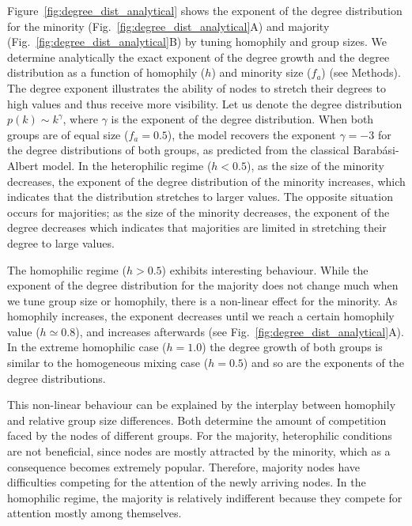 \noindent Figure~\ref{fig:degree_dist_analytical} shows the exponent of the degree distribution for the minority (Fig.~\ref{fig:degree_dist_analytical}A) and majority (Fig.~\ref{fig:degree_dist_analytical}B) by tuning homophily and group sizes. We determine analytically the exact exponent of the degree growth and the degree distribution as a function of homophily ($h$) and minority size ($f_a$) (see Methods). The degree exponent illustrates the ability of nodes to stretch their degrees to high values and thus receive more visibility. Let us denote the degree distribution $p(k) \sim k^{\gamma}$, where $\gamma$ is the exponent of the degree distribution. When both groups are of equal size ($f_a = 0.5$), the model recovers the exponent $\gamma = -3$ for the degree distributions of both groups, as predicted from the classical  Barab\'{a}si-Albert model. In the heterophilic regime ($h<0.5$), as the size of the minority decreases, the exponent of the degree distribution of the minority increases, which indicates that the distribution stretches to larger values. The opposite situation occurs for majorities; as the size of the minority decreases, the exponent of the degree decreases which indicates that majorities are limited in stretching their degree to large values. 


The homophilic regime ($h>0.5$) exhibits interesting behaviour. While the exponent of the degree distribution for the majority does not change much when we tune group size or homophily, there is a non-linear effect for the minority. As homophily increases, the exponent decreases until we reach a certain homophily value ($h \simeq 0.8$), and increases afterwards (see Fig.~\ref{fig:degree_dist_analytical}A). In the extreme homophilic case ($h = 1.0$) the degree growth of both groups is similar to the homogeneous mixing case ($h = 0.5$) and so are the exponents of the degree distributions. 

This non-linear behaviour can be explained by the interplay between homophily and relative group size differences. Both determine the amount of competition faced by the nodes of different groups. For the majority, heterophilic conditions are not beneficial, since nodes are mostly attracted by the minority, which as a consequence becomes extremely popular. Therefore, majority nodes have difficulties competing for the attention of the newly arriving nodes. In the homophilic regime, the majority is relatively indifferent because they compete for attention mostly among themselves. 

